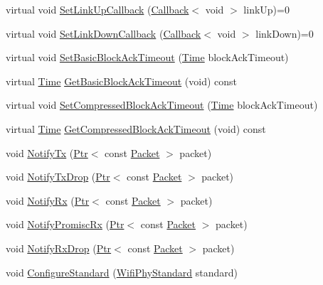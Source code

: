 \begin{DoxyCompactItemize}
\item 
virtual void \hyperlink{classns3_1_1WifiMac_a7216f476412946276b93e413c13eca72}{Set\+Link\+Up\+Callback} (\hyperlink{classns3_1_1Callback}{Callback}$<$ void $>$ link\+Up)=0
\item 
virtual void \hyperlink{classns3_1_1WifiMac_acafcbc6ab58a61ee45f5bd96ed3f825d}{Set\+Link\+Down\+Callback} (\hyperlink{classns3_1_1Callback}{Callback}$<$ void $>$ link\+Down)=0
\item 
virtual void \hyperlink{classns3_1_1WifiMac_a77f3d5d77174ab4208e773adb504de3b}{Set\+Basic\+Block\+Ack\+Timeout} (\hyperlink{classns3_1_1Time}{Time} block\+Ack\+Timeout)
\item 
virtual \hyperlink{classns3_1_1Time}{Time} \hyperlink{classns3_1_1WifiMac_aba734e2f1a0ed6ec557830d863e2077b}{Get\+Basic\+Block\+Ack\+Timeout} (void) const 
\item 
virtual void \hyperlink{classns3_1_1WifiMac_a37abec00070d23923703ebcf5151e84e}{Set\+Compressed\+Block\+Ack\+Timeout} (\hyperlink{classns3_1_1Time}{Time} block\+Ack\+Timeout)
\item 
virtual \hyperlink{classns3_1_1Time}{Time} \hyperlink{classns3_1_1WifiMac_a1f22616df6556678d50482ab5a015df3}{Get\+Compressed\+Block\+Ack\+Timeout} (void) const 
\item 
void \hyperlink{classns3_1_1WifiMac_a91beed0c82ad6232aa5165fbc9df88fe}{Notify\+Tx} (\hyperlink{classns3_1_1Ptr}{Ptr}$<$ const \hyperlink{classns3_1_1Packet}{Packet} $>$ packet)
\item 
void \hyperlink{classns3_1_1WifiMac_aef7418bfb03d5146dda41c392f3e6671}{Notify\+Tx\+Drop} (\hyperlink{classns3_1_1Ptr}{Ptr}$<$ const \hyperlink{classns3_1_1Packet}{Packet} $>$ packet)
\item 
void \hyperlink{classns3_1_1WifiMac_aa96da471042cfc760483b0ca962f5174}{Notify\+Rx} (\hyperlink{classns3_1_1Ptr}{Ptr}$<$ const \hyperlink{classns3_1_1Packet}{Packet} $>$ packet)
\item 
void \hyperlink{classns3_1_1WifiMac_a7dd2d7f781270f0d763017a04479ab85}{Notify\+Promisc\+Rx} (\hyperlink{classns3_1_1Ptr}{Ptr}$<$ const \hyperlink{classns3_1_1Packet}{Packet} $>$ packet)
\item 
void \hyperlink{classns3_1_1WifiMac_acc2ef3079b2a6ac4fb3838608e5e1ed4}{Notify\+Rx\+Drop} (\hyperlink{classns3_1_1Ptr}{Ptr}$<$ const \hyperlink{classns3_1_1Packet}{Packet} $>$ packet)
\item 
void \hyperlink{classns3_1_1WifiMac_a16ec5352c804df83e42159ab4e2e73d8}{Configure\+Standard} (\hyperlink{group__wifi_ga1299834f4e1c615af3ca738033b76a49}{Wifi\+Phy\+Standard} standard)
\end{DoxyCompactItemize}
